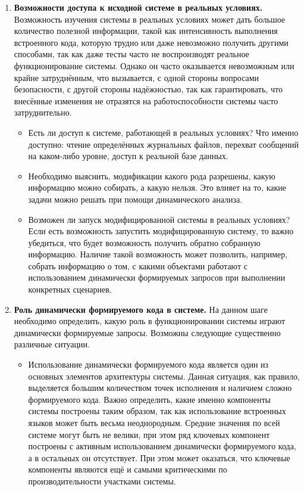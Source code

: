 \begin{enumerate}
  \item \textbf{Возможности доступа к исходной системе в реальных условиях.} Возможность изучения системы в реальных условиях может дать большое количество полезной информации, такой как интенсивность выполнения встроенного кода, которую трудно или даже невозможно получить другими способами, так как даже тесты часто не воспроизводят реальное функционирование системы. Однако он часто оказывается невозможным или крайне затруднённым, что вызывается, с одной стороны вопросами безопасности, с другой стороны надёжностью, так как гарантировать, что внесённые изменения не отразятся на работоспособности системы часто затруднительно.  
  \begin{itemize}
    \item Есть ли доступ к системе, работающей в реальных условиях? Что именно доступно: чтение определённых журнальных файлов, перехват сообщений на каком-либо уровне, доступ к реальной базе данных.
    \item Необходимо выяснить, модификации какого рода разрешены, какую информацию можно собирать, а какую нельзя. Это влияет на то, какие задачи можно решать при помощи динамического анализа.
    \item Возможен ли запуск модифицированной системы в реальных условиях? Если есть возможность запустить модифицированную систему, то важно убедиться, что будет возможность получить обратно собранную информацию. Наличие такой возможность может позволить, например, собрать информацию о том, с какими объектами работают с использованием динамически формируемых запросов при выполнении конкретных сценариев.
  \end{itemize}

  
  \item \textbf{Роль динамически формируемого кода в системе.} На данном шаге необходимо определить, какую роль в функционировании системы играют динамически формируемые запросы. Возможны следующие существенно различные ситуации.
  \begin{itemize}
    \item Использование динамически формируемого кода является один из основных элементов архитектуры системы. Данная ситуация, как правило, выделяется большим количеством точек исполнения и наличием сложно формируемого кода. Важно определить, какие именно компоненты системы построены таким образом, так как использование встроенных языков может быть весьма неоднородным. Средние значения по всей системе могут быть не велики, при этом ряд ключевых компонент построены с активным использованием динамически формируемого кода, а в остальных он отсутствует. При этом может оказаться, что ключевые компоненты являются ещё и самыми критическими по производительности участками системы.
    

\end{itemize}
\end{enumerate}
